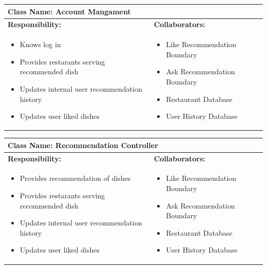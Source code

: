 \documentclass[]{article}
\begin{document}
\begin{table}[H]
	\centering
	\begin{tabular}{|p{7cm}|p{7cm}|}
	\hline 
	 \multicolumn{2}{|l|}{\textbf{Class Name:} Account Mangament} \\
	\hline
	\textbf{Responsibility:} & \textbf{Collaborators:} \\
	\hline
	\raggedright
	\begin{itemize}
		\item Knows log in
		\item  Provides restarants serving recommended dish
		\item Updates internal user recommendation history
		\item Updates user liked dishes
	\end{itemize}
	\vspace{1in} & 
	\begin{itemize}
		\item Like Recommendation Boundary
		\item Ask Recommendation Boundary
		\item Restaurant Database
		\item User History Database
	\end{itemize} \\
	\hline
	\end{tabular}
\end{table}


\begin{table}[H]
	\centering
	\begin{tabular}{|p{7cm}|p{7cm}|}
	\hline 
	 \multicolumn{2}{|l|}{\textbf{Class Name: Recommendation Controller}} \\
	\hline
	\textbf{Responsibility:} & \textbf{Collaborators:} \\
	\hline
	\raggedright
	\begin{itemize}
		\item Provides recommendation of dishes
		\item Provides restarants serving recommended dish
		\item Updates internal user recommendation history
		\item Updates user liked dishes
	\end{itemize}
	\vspace{1in} & 
	\begin{itemize}
		\item Like Recommendation Boundary
		\item Ask Recommendation Boundary
		\item Restaurant Database
		\item User History Database
	\end{itemize} \\
	\hline
	\end{tabular}
\end{table}
\end{document}
